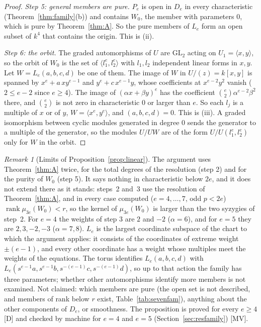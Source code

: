 \documentclass[11pt]{article}
\theoremstyle{definition}
\theoremstyle{remark}
\newtheorem{remark}{Remark}
\begin{document}
\begin{proof}
\emph{Step 5: general members are pure.} $P_e$ is open in $D_e$ in every characteristic (Theorem~\ref{thm:family}(b)) and contains $W_0$, the member with parameters $0$, which is pure by Theorem~\ref{thm:A}. So the pure members of $L_e$ form an open subset of $k^4$ that contains the origin. This is (ii).

\emph{Step 6: the orbit.} The graded automorphisms of $U$ are $\mathrm{GL}_2$ acting on $U_1=\langle x,y\rangle$, so the orbit of $W_0$ is the set of $\langle l_1^e,l_2^e\rangle$ with $l_1,l_2$ independent linear forms in $x,y$. Let $W=L_e(a,b,c,d)$ be one of them. The image of $W$ in $U/(z)=k[x,y]$ is spanned by $x^e+a\,xy^{e-1}$ and $y^e+c\,x^{e-1}y$, whose coefficients at $x^{e-2}y^2$ vanish ($2\le e-2$ since $e\ge4$). The image of $(\alpha x+\beta y)^e$ has the coefficient $\binom e2\alpha^{e-2}\beta^2$ there, and $\binom e2$ is not zero in characteristic $0$ or larger than $e$. So each $l_j$ is a multiple of $x$ or of $y$, $W=\langle x^e,y^e\rangle$, and $(a,b,c,d)=0$. This is (iii). A graded isomorphism between cyclic modules generated in degree $0$ sends the generator to a multiple of the generator, so the modules $U/UW$ are of the form $U/U(l_1^e,l_2^e)$ only for $W$ in the orbit.
\end{proof}

\begin{remark}[{Limits of Proposition~\ref{prop:linear}}]
The argument uses Theorem~\ref{thm:A} twice, for the total degrees of the resolution (step 2) and for the purity of $W_0$ (step 5). It says nothing in characteristic below $2e$, and it does not extend there as it stands: steps~2 and~3 use the resolution of Theorem~\ref{thm:A}, and in every case computed ($e=4,\dots,7$, odd $p<2e$) $\operatorname{rank}\mu_{3e}(W_0)<r$, so the kernel of $\mu_{3e}(W_0)$ is larger than the two syzygies of step~2. For $e=4$ the weights of step 3 are $2$ and $-2$ ($\alpha=6$), and for $e=5$ they are $2,3,-2,-3$ ($\alpha=7,8$). $L_e$ is the largest coordinate subspace of the chart to which the argument applies: it consists of the coordinates of extreme weight $\pm(e-1)$, and every other coordinate has a weight whose multiples meet the weights of the equations. The torus identifies $L_e(a,b,c,d)$ with $L_e(s^{e-1}a,s^{e-1}b,s^{-(e-1)}c,s^{-(e-1)}d)$, so up to that action the family has three parameters; whether other automorphisms identify more members is not examined. Not claimed: which members are pure (the open set is not described, and members of rank below $r$ exist, Table~\ref{tab:sevenfam}), anything about the other components of $D_e$, or smoothness. The proposition is proved for every $e\ge4$ [D] and checked by machine for $e=4$ and $e=5$ (Section~\ref{sec:resfamily}) [MV].
\end{remark}
\end{document}
